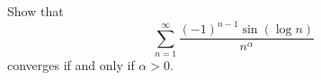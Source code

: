 Show that \[\sum^{\infty}_{n=1}\frac{(-1)^{n-1}\sin(\log n)}{n^\alpha}\] converges if and only if \(\alpha>0\).